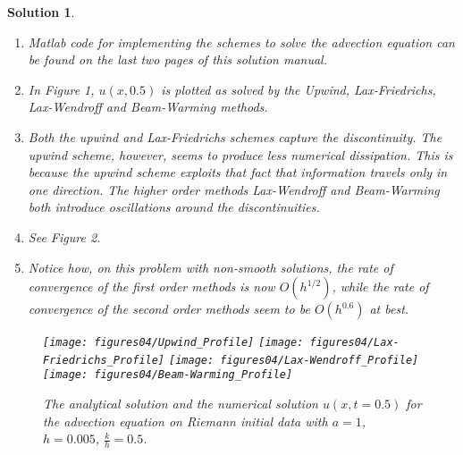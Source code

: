 \documentclass[10pt,letterpaper]{article}
\newcommand{\frb}[1]{ \left(  {#1} \right) }
\theoremstyle{break}
\newtheorem{mysolution}{Solution}
\newenvironment{solution}{\begin{mysolution}}{\end{mysolution}}
\begin{document}
\begin{solution}
	\begin{enumerate}
		\item
		Matlab code for implementing the schemes to solve the advection equation can be found on the last two pages of this solution manual.
		
		\item
		In Figure 1, $u\frb{x,0.5}$ is plotted as solved by the Upwind, Lax-Friedrichs, Lax-Wendroff and Beam-Warming methods.
		
		\item
		Both the upwind and Lax-Friedrichs schemes capture the discontinuity.
		The upwind scheme, however, seems to produce less numerical dissipation.
		This is because the upwind scheme exploits that fact that information travels only in one direction.
		The higher order methods Lax-Wendroff and Beam-Warming both introduce oscillations around the discontinuities.
		
		\item[(d),(e)]
		\addtocounter{enumii}{2}
		See Figure 2.
		
		
		\item
		Notice how, on this problem with non-smooth solutions, the rate of convergence of the first order methods is now $O\frb{h^{1/2}}$, while the rate of convergence of the second order methods seem to be $O\frb{h^{0.6}}$ at best.
    \end{enumerate}
		
		
		
		
		
    \newpage
    \begin{figure}[H] 
    \begin{center}
    {\texttt{[image: figures04/Upwind\_Profile]}} 
    {\texttt{[image: figures04/Lax-Friedrichs\_Profile]}} 
    {\texttt{[image: figures04/Lax-Wendroff\_Profile]}} 
    {\texttt{[image: figures04/Beam-Warming\_Profile]}} 
    \caption{ The analytical solution and the numerical solution $u(x,t=0.5)$ for the advection equation on Riemann initial data with $a=1$, $h=0.005$, $\frac{k}{h}=0.5$.} 
    \end{center}
    \end{figure}
    

\end{solution}
\end{document}
